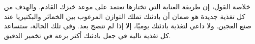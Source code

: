 خلاصة القول، إن طريقة العناية التي تختارها تعتمد على موعد خبزك القادم. والهدف من كل تغذية جديدة هو ضمان أن بادئتك تملك التوازن المرغوب بين الخمائر والبكتيريا عند صنع العجين. ولا داعي لتغذية بادئتك يوميًا، إلا إذا لم تنضج بعد. وفي تلك الحالة، ستساعد كل تغذية تالية في جعل بادئتك أكثر برعة في تخمير الدقيق.
